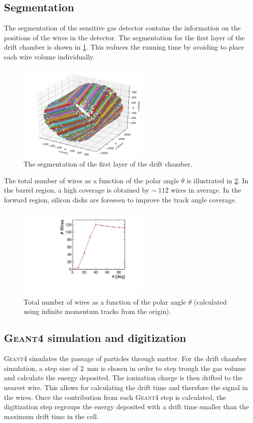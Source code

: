 \documentclass{cernatsnote}
\begin{document}
\subsection{Segmentation}

The segmentation of the sensitive gas detector contains the information on the positions of the wires in the detector. The segmentation for the first layer of the drift chamber is shown in \cref{fig_segmentation_first_case}. This reduces the running time by avoiding to place each wire volume individually.

\begin{figure}[!t]
	\centering
	\includegraphics[width=2.5in]{figures/allHits}
	\caption{The segmentation of the first layer of the drift chamber.}
	\label{fig_segmentation_first_case}
\end{figure}

The total number of wires as a function of the polar angle $\theta$ is illustrated in \cref{fig_segmentation_second_case}. In the barrel region, a high coverage is obtained by $\sim~112$ wires in average. In the forward region, silicon disks are foreseen to improve the track angle coverage.

\begin{figure}[!t]
	\centering
	\includegraphics[width=2.5in]{figures/numWires}%
	\caption{Total number of wires as a function of the polar angle $\theta$ (calculated using infinite momentum tracks from the origin).}
	\label{fig_segmentation_second_case}
\end{figure}


\subsection{\textsc{Geant4} simulation and digitization}
\textsc{Geant4} simulates the passage of particles through matter. For the drift chamber simulation, a step size of 2~mm is chosen in order to step trough the gas volume and calculate the energy deposited. The ionization charge is then drifted to the nearest wire. This allows for calculating the drift time and therefore the signal in the wires. Once the contribution from each \textsc{Geant4} step is calculated, the digitization step regroups the energy deposited with a drift time smaller than the maximum drift time in the cell.
\end{document}
